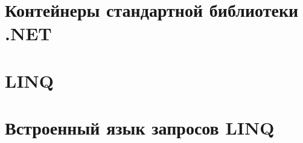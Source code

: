 \documentclass{../../text-style}
\begin{document}
\maketitle
\thispagestyle{empty}

\section{Контейнеры стандартной библиотеки .NET}

\section{LINQ}

\section{Встроенный язык запросов LINQ}
\end{document}
